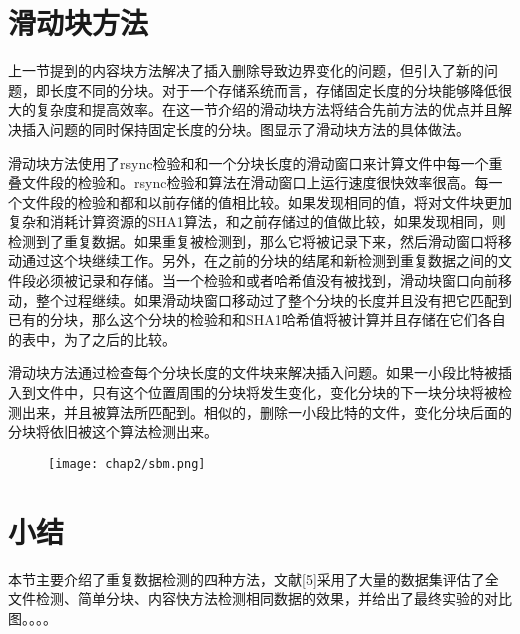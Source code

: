 \section{滑动块方法}
\label{sec:slidingblock}

上一节提到的内容块方法解决了插入删除导致边界变化的问题，但引入了新的问题，即长度不同的分块。对于一个存储系统而言，存储固定长度的分块能够降低很大的复杂度和提高效率。在这一节介绍的滑动块方法将结合先前方法的优点并且解决插入问题的同时保持固定长度的分块。图显示了滑动块方法的具体做法。

滑动块方法使用了rsync检验和和一个分块长度的滑动窗口来计算文件中每一个重叠文件段的检验和。rsync检验和算法在滑动窗口上运行速度很快效率很高。每一个文件段的检验和都和以前存储的值相比较。如果发现相同的值，将对文件块更加复杂和消耗计算资源的SHA1算法，和之前存储过的值做比较，如果发现相同，则检测到了重复数据。如果重复被检测到，那么它将被记录下来，然后滑动窗口将移动通过这个块继续工作。另外，在之前的分块的结尾和新检测到重复数据之间的文件段必须被记录和存储。当一个检验和或者哈希值没有被找到，滑动块窗口向前移动，整个过程继续。如果滑动块窗口移动过了整个分块的长度并且没有把它匹配到已有的分块，那么这个分块的检验和和SHA1哈希值将被计算并且存储在它们各自的表中，为了之后的比较。

滑动块方法通过检查每个分块长度的文件块来解决插入问题。如果一小段比特被插入到文件中，只有这个位置周围的分块将发生变化，变化分块的下一块分块将被检测出来，并且被算法所匹配到。相似的，删除一小段比特的文件，变化分块后面的分块将依旧被这个算法检测出来。

\begin{figure}[!hbp]
    \begin{minipage}[b]{1\textwidth}
    \captionstyle{\centering}
    \centering
    \texttt{[image: chap2/sbm.png]}
    \end{minipage}
\end{figure}

\section{小结}
\label{sec:relatedwork}
本节主要介绍了重复数据检测的四种方法，文献[5]采用了大量的数据集评估了全文件检测、简单分块、内容快方法检测相同数据的效果，并给出了最终实验的对比图。。。。
